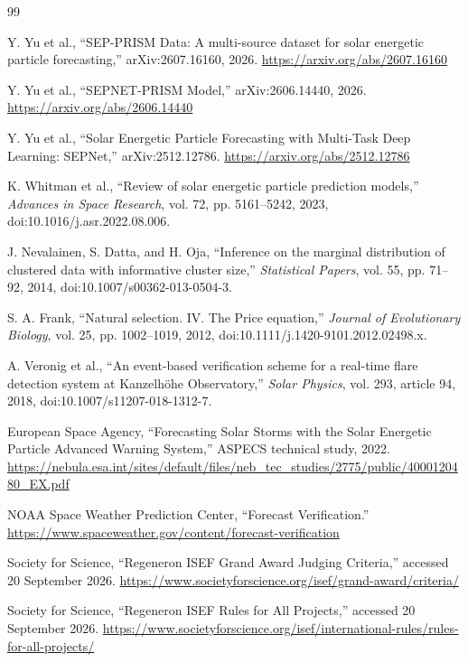 \documentclass[11pt]{article}
\begin{document}
\begin{thebibliography}{99}

Y. Yu et al., ``SEP-PRISM Data: A multi-source dataset for solar energetic particle forecasting,'' arXiv:2607.16160, 2026. \url{https://arxiv.org/abs/2607.16160}

Y. Yu et al., ``SEPNET-PRISM Model,'' arXiv:2606.14440, 2026. \url{https://arxiv.org/abs/2606.14440}

Y. Yu et al., ``Solar Energetic Particle Forecasting with Multi-Task Deep Learning: SEPNet,'' arXiv:2512.12786. \url{https://arxiv.org/abs/2512.12786}

K. Whitman et al., ``Review of solar energetic particle prediction models,'' \emph{Advances in Space Research}, vol. 72, pp. 5161--5242, 2023, doi:10.1016/j.asr.2022.08.006.

J. Nevalainen, S. Datta, and H. Oja, ``Inference on the marginal distribution of clustered data with informative cluster size,'' \emph{Statistical Papers}, vol. 55, pp. 71--92, 2014, doi:10.1007/s00362-013-0504-3.

S. A. Frank, ``Natural selection. IV. The Price equation,'' \emph{Journal of Evolutionary Biology}, vol. 25, pp. 1002--1019, 2012, doi:10.1111/j.1420-9101.2012.02498.x.

A. Veronig et al., ``An event-based verification scheme for a real-time flare detection system at Kanzelhöhe Observatory,'' \emph{Solar Physics}, vol. 293, article 94, 2018, doi:10.1007/s11207-018-1312-7.

European Space Agency, ``Forecasting Solar Storms with the Solar Energetic Particle Advanced Warning System,'' ASPECS technical study, 2022. \url{https://nebula.esa.int/sites/default/files/neb_tec_studies/2775/public/4000120480_EX.pdf}

NOAA Space Weather Prediction Center, ``Forecast Verification.'' \url{https://www.spaceweather.gov/content/forecast-verification}

Society for Science, ``Regeneron ISEF Grand Award Judging Criteria,'' accessed 20 September 2026. \url{https://www.societyforscience.org/isef/grand-award/criteria/}

Society for Science, ``Regeneron ISEF Rules for All Projects,'' accessed 20 September 2026. \url{https://www.societyforscience.org/isef/international-rules/rules-for-all-projects/}

\end{thebibliography}
\end{document}
